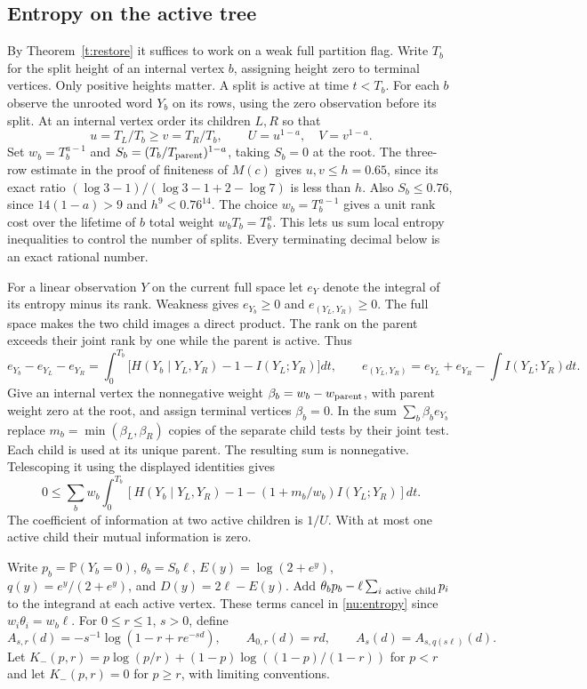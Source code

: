 \documentclass[11pt]{article}
\numberwithin{equation}{section}
\newcommand{\PP}{\mathbb P}
\begin{document}
\subsection{Entropy on the active tree}

By Theorem~\ref{t:restore} it suffices to work on a weak full
partition flag. Write $T_b$ for the split height of an internal
vertex $b$, assigning height zero to terminal vertices. Only
positive heights matter. A split is active at time $t<T_b$.
For each $b$ observe the unrooted word $Y_b$ on its rows, using
the zero observation before its split. At an internal vertex order
its children $L,R$ so that
\[
 u=T_L/T_b\ge v=T_R/T_b,\qquad U=u^{1-a},\quad V=v^{1-a}.
\]
Set $w_b=T_b^{a-1}$ and $S_b=(T_b/T_{\rm parent})^{1-a}$,
taking $S_b=0$ at the root. The three-row estimate in the proof
of finiteness of $M(c)$ gives $u,v\le h=0.65$, since its exact
ratio $(\log3-1)/(\log3-1+2-\log7)$ is less than $h$.
Also $S_b\le0.76$, since $14(1-a)>9$ and $h^9<0.76^{14}$.
The choice $w_b=T_b^{a-1}$ gives a unit rank cost over the lifetime
of $b$ total weight $w_bT_b=T_b^a$. This lets us sum local entropy
inequalities to control the number of splits. Every terminating
decimal below is an exact rational number.

For a linear observation $Y$ on the current full space let $e_Y$
denote the integral of its entropy minus its rank. Weakness gives
$e_{Y_b}\ge0$ and $e_{(Y_L,Y_R)}\ge0$. The full space makes the
two child images a direct product. The rank on the parent exceeds
their joint rank by one while the parent is active. Thus
\[
 e_{Y_b}-e_{Y_L}-e_{Y_R}
  =\int_0^{T_b}\big[H(Y_b\mid Y_L,Y_R)-1-I(Y_L;Y_R)\big]dt,
 \qquad
 e_{(Y_L,Y_R)}=e_{Y_L}+e_{Y_R}-\int I(Y_L;Y_R)dt .
\]
Give an internal vertex the nonnegative weight
$\beta_b=w_b-w_{\rm parent}$, with parent weight zero at the
root, and assign terminal vertices $\beta_b=0$. In the sum
$\sum_b\beta_b e_{Y_b}$ replace $m_b=\min(\beta_L,\beta_R)$
copies of the separate child tests by their joint test. Each child
is used at its unique parent. The resulting sum is nonnegative.
Telescoping it using the displayed identities gives
\begin{equation}
 0\le\sum_b w_b\int_0^{T_b}
   [H(Y_b\mid Y_L,Y_R)-1-(1+m_b/w_b)I(Y_L;Y_R)]dt .       \label{nu:entropy}
\end{equation}
The coefficient of information at two active children is $1/U$.
With at most one active child their mutual information is zero.

Write $p_b=\PP(Y_b=0)$, $\theta_b=S_b\ell$, $E(y)=\log(2+e^y)$,
$q(y)=e^y/(2+e^y)$, and $D(y)=2\ell-E(y)$. Add
$\theta_bp_b-\ell\sum_{i\ {\rm active\ child}}p_i$ to the
integrand at each active vertex. These terms cancel in
\eqref{nu:entropy} since $w_i\theta_i=w_b\ell$.
For $0\le r\le1$, $s>0$, define
\[
 A_{s,r}(d)=-s^{-1}\log(1-r+re^{-sd}),\qquad
 A_{0,r}(d)=rd,\qquad A_s(d)=A_{s,q(s\ell)}(d).
\]
Let $K_-(p,r)=p\log(p/r)+(1-p)\log((1-p)/(1-r))$ for $p<r$
and let $K_-(p,r)=0$ for $p\ge r$, with limiting conventions.
\end{document}
